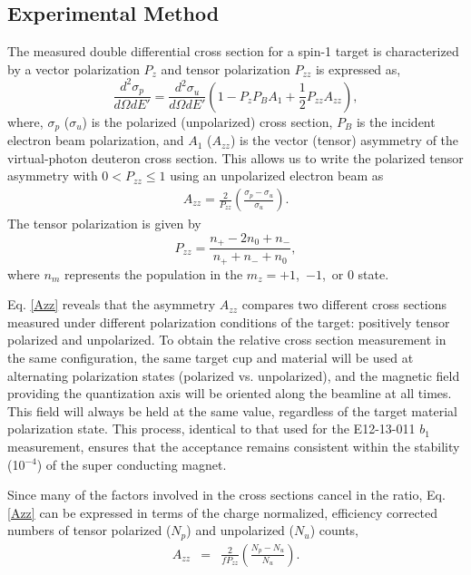 \subsection{Experimental Method} %

The measured double differential cross section for a spin-1 target is characterized by a vector polarization $P_{z}$ and tensor polarization
$P_{zz}$ is expressed as,
\begin{equation}
\frac{d^2\sigma_p}{d\Omega dE'}=\frac{d^2\sigma_u}{d\Omega dE'}\left(1-P_zP_BA_1+\frac{1}{2}P_{zz}A_{zz}\right),
\label{eq:one}
\end{equation}
where, $\sigma_p$ ($\sigma_u$) is the polarized (unpolarized) cross section, $P_B$ is the incident electron beam polarization, and $A_1$ ($A_{zz}$) is the
vector (tensor) asymmetry of the virtual-photon deuteron cross section.  This allows us to write
the polarized tensor asymmetry with $0<P_{zz}\leq 1$ using an unpolarized electron beam as
\begin{eqnarray}
\label{Azz}
A_{zz} = \frac{2}{P_{zz}}\left(\frac{\sigma_p - \sigma_u}{\sigma_u}\right).
\end{eqnarray}
The tensor polarization is given by 
\begin{equation}
P_{zz}=\frac{n_+-2n_0+n_-}{n_++n_-+n_0},
\end{equation}
where $n_m$ represents the population in the $m_z=+1$,~$-1$,~or $0$ state.

Eq. \ref{Azz} reveals that the asymmetry $A_{zz}$ compares two different cross sections measured under different polarization conditions of the target: positively tensor polarized and unpolarized.  
To obtain the relative cross section measurement in the same configuration, the same target cup and material will be used at alternating polarization states (polarized vs. unpolarized),  and the magnetic field providing the quantization axis will be oriented along the beamline at all times.
This field will always be held at the same value, regardless of the target material polarization state. 
This process, identical to that used for the E12-13-011 $b_1$ measurement, ensures that the acceptance remains consistent within the stability (10$^{-4}$) of the super conducting magnet.  


Since many of the factors involved in the cross sections cancel in
the ratio, Eq. \ref{Azz} can be expressed in terms 
of the charge normalized, efficiency corrected numbers of tensor polarized ($N_p$) and unpolarized ($N_u$) counts, 
\begin{eqnarray} \label{3}
A_{zz}&=&\frac{2}{fP_{zz}}\left(\frac{N_p - N_u}{N_u}\right) .
\end{eqnarray}

